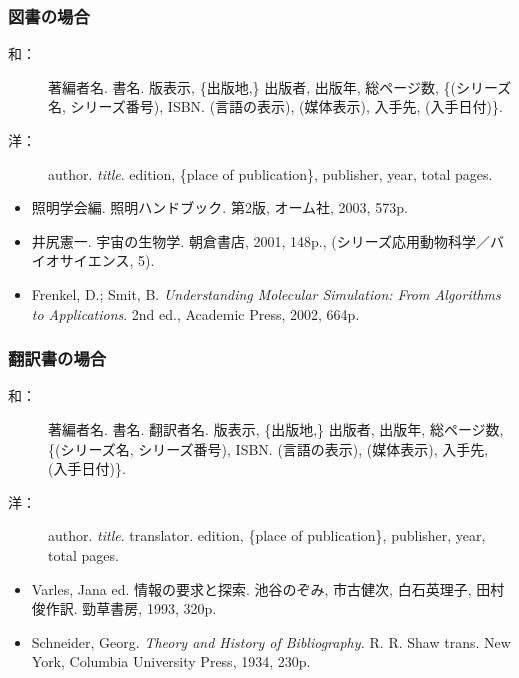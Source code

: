 
		\subsubsection{図書の場合}

			\begin{description}
				\item[和：] 著編者名. 書名. 版表示, \{出版地,\} 出版者, 出版年, 総ページ数, \{(シリーズ名, シリーズ番号), ISBN. (言語の表示), (媒体表示), 入手先, (入手日付)\}.
				\item[洋：] author. \textit{title}. edition, \{place of publication\}, publisher, year, total pages.
			\end{description}

			\begin{screen} \begin{itemize}
				\item 照明学会編. 照明ハンドブック. 第2版, オーム社, 2003, 573p.

				\item 井尻憲一. 宇宙の生物学. 朝倉書店, 2001, 148p., (シリーズ応用動物科学／バイオサイエンス, 5).

				\item Frenkel, D.; Smit, B. \textit{Understanding Molecular Simulation: From Algorithms to Applications}. 2nd ed., Academic Press, 2002, 664p.
			\end{itemize} \end{screen}


		\subsubsection{翻訳書の場合}

			\begin{description}
				\item[和：] 著編者名. 書名. 翻訳者名. 版表示, \{出版地,\} 出版者, 出版年, 総ページ数, \{(シリーズ名, シリーズ番号), ISBN. (言語の表示), (媒体表示), 入手先, (入手日付)\}.
				\item[洋：] author. \textit{title}. translator. edition, \{place of publication\}, publisher, year, total pages.
			\end{description}

			\begin{screen} \begin{itemize}
				\item Varles, Jana ed. 情報の要求と探索. 池谷のぞみ, 市古健次, 白石英理子, 田村俊作訳. 勁草書房, 1993, 320p.

				\item Schneider, Georg. \textit{Theory and History of Bibliography.} R. R. Shaw trans. New York, Columbia University Press, 1934, 230p.
			\end{itemize} \end{screen}

